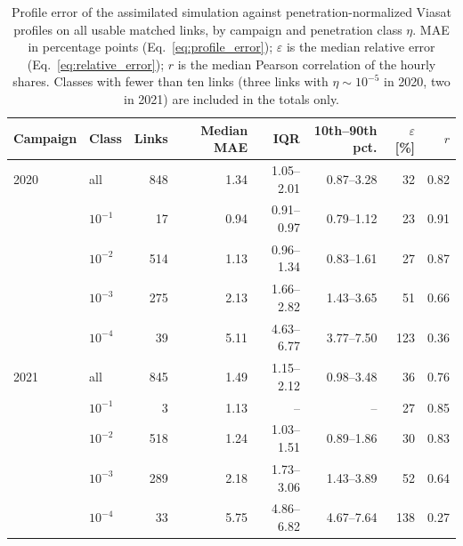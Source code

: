 \begin{table}[htbp]
\centering
\caption{Profile error of the assimilated simulation against penetration-normalized Viasat profiles on all usable matched links, by campaign and penetration class $\eta$. MAE in percentage points (Eq.~\eqref{eq:profile_error}); $\varepsilon$ is the median relative error (Eq.~\eqref{eq:relative_error}); $r$ is the median Pearson correlation of the hourly shares. Classes with fewer than ten links (three links with $\eta\sim10^{-5}$ in 2020, two in 2021) are included in the totals only.}
\label{tab:validation_all}
\begin{tabular}{@{}llrrrrrr@{}}
\toprule
Campaign & Class & Links & Median MAE & IQR & 10th--90th pct. & $\varepsilon$ [\%] & $r$ \\
\midrule
2020 & all & 848 & 1.34 & 1.05--2.01 & 0.87--3.28 & 32 & 0.82 \\
 & $10^{-1}$ & 17 & 0.94 & 0.91--0.97 & 0.79--1.12 & 23 & 0.91 \\
 & $10^{-2}$ & 514 & 1.13 & 0.96--1.34 & 0.83--1.61 & 27 & 0.87 \\
 & $10^{-3}$ & 275 & 2.13 & 1.66--2.82 & 1.43--3.65 & 51 & 0.66 \\
 & $10^{-4}$ & 39 & 5.11 & 4.63--6.77 & 3.77--7.50 & 123 & 0.36 \\
\midrule
2021 & all & 845 & 1.49 & 1.15--2.12 & 0.98--3.48 & 36 & 0.76 \\
 & $10^{-1}$ & 3 & 1.13 & -- & -- & 27 & 0.85 \\
 & $10^{-2}$ & 518 & 1.24 & 1.03--1.51 & 0.89--1.86 & 30 & 0.83 \\
 & $10^{-3}$ & 289 & 2.18 & 1.73--3.06 & 1.43--3.89 & 52 & 0.64 \\
 & $10^{-4}$ & 33 & 5.75 & 4.86--6.82 & 4.67--7.64 & 138 & 0.27 \\
\bottomrule
\end{tabular}
\end{table}
